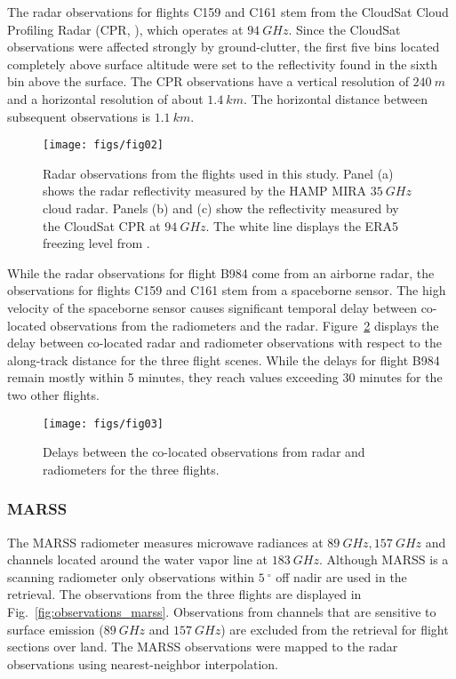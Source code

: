 \documentclass[journal abbreviation, manuscript]{copernicus}
\begin{document}
The radar observations for flights C159 and C161 stem from the CloudSat Cloud
Profiling Radar (CPR, \citet{tanelli08}), which operates at $94\ \unit{GHz}$.
Since the CloudSat observations were affected strongly by ground-clutter, the
first five bins located completely above surface altitude were set to the
reflectivity found in the sixth bin above the surface. The CPR observations
have a vertical resolution of $240\ \unit{m}$ and a horizontal resolution of
about $1.4\ \unit{km}$. The horizontal distance between subsequent observations is
$1.1\ \unit{km}$.

\begin{figure}[hbpt!]
  \centering
  \texttt{[image: figs/fig02]}
  \caption{Radar observations from the flights used in this study. Panel (a)
    shows the radar reflectivity measured by the HAMP MIRA $35\ \unit{GHz}$
    cloud radar. Panels (b) and (c) show the reflectivity measured by the
    CloudSat CPR at $94\ \unit{GHz}$. The white line displays the ERA5 freezing
    level from \citet{era5}. }
  \label{fig:observations_radar}
\end{figure}

While the radar observations for flight B984 come from an airborne radar, the
observations for flights C159 and C161 stem from a spaceborne sensor. The high
velocity of the spaceborne sensor causes significant temporal delay between
co-located observations from the radiometers and the radar.
Figure~\ref{fig:delay} displays the delay between co-located radar and
radiometer observations with respect to the along-track distance for the three
flight scenes. While the delays for flight B984 remain mostly within 5
minutes, they reach values exceeding 30 minutes for the two other flights.

\begin{figure}[hbpt!]
  \centering
  \texttt{[image: figs/fig03]}
  \caption{Delays between the co-located observations from radar and radiometers
  for the three flights.}
  \label{fig:delay}
\end{figure}

\subsubsection{MARSS}

The MARSS radiometer measures microwave radiances at $89\ \unit{GHz},
157\ \unit{GHz}$ and channels located around the water vapor line at $183
\ \unit{GHz}$. Although MARSS is a scanning radiometer only observations within
$5\ \unit{^\circ}$ off nadir are used in the retrieval. The observations from
the three flights are displayed in Fig.~\ref{fig:observations_marss}.
Observations from channels that are sensitive to surface emission
($89\ \unit{GHz}$ and $157\ \unit{GHz}$) are excluded from the retrieval for
flight sections over land. The MARSS observations were mapped to the radar
observations using nearest-neighbor interpolation.
\end{document}
